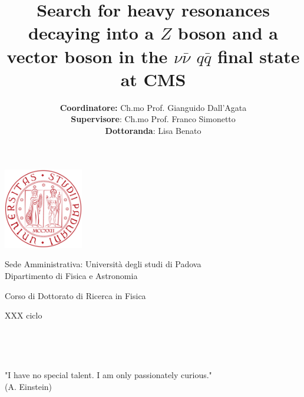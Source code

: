 \documentclass[11pt, a4paper]{book}
\title{Search for heavy resonances decaying into a $Z$ boson and a vector boson in the $\nu \bar{\nu}$ $q\bar{q}$ final state at CMS}
\date{}
\author{\Large{ \textbf{Coordinatore:} Ch.mo Prof. Gianguido Dall'Agata \\ \textbf{Supervisore}: Ch.mo Prof. Franco Simonetto \\ \vspace*{1\baselineskip} \textbf{Dottoranda}: Lisa Benato}} %
\affil{Universit\`a degli studi di Padova}
\begin{document}
\begin{titlingpage} %
\begin{center}
\includegraphics[height=3.5cm]{logo}\\ %
\begin{large}
\vspace*{1.cm}
Sede Amministrativa: Universit\`a degli studi di Padova \\ %
\vspace*{0.5\baselineskip}
Dipartimento di Fisica e Astronomia\\
\end{large}
\vspace{2.cm} %
\begin{huge}
Corso di Dottorato di Ricerca in Fisica

\vspace*{1\baselineskip}

XXX ciclo
\end{huge}
\vspace{1.5cm}
\begin{tcolorbox}[breakable,colback=black!5!white,colframe=red!80!black,width=\textwidth]
\begin{center}
\begin{Huge} 
{\color{red!80!black}\textbf{\thetitle}} \\
\end{Huge}
\end{center}
\end{tcolorbox}
\vspace{3.5cm}
\theauthor\\
\end{center}
\end{titlingpage}

\newpage\null\thispagestyle{empty}\newpage
\thispagestyle{empty}
\begin{flushright}
\null{}
"I have no special talent. I am only passionately curious."\\
(A. Einstein)
\null
\end{flushright}
\end{document}
